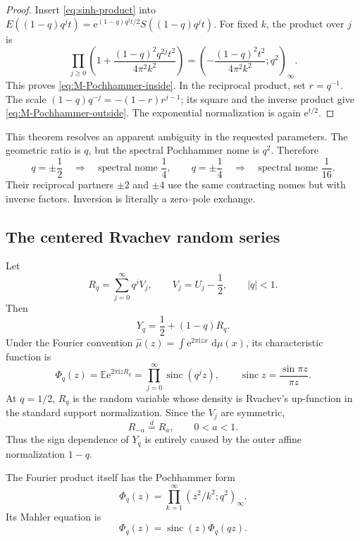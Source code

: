 \documentclass[11pt,oneside]{article}
\numberwithin{equation}{section}
\theoremstyle{definition}
\theoremstyle{remark}
\newcommand{\sinc}{\operatorname{sinc}}
\newcommand{\E}{\mathbb E}
\newcommand{\dd}{\,\mathrm d}
\newcommand{\e}{\mathrm e}
\newcommand{\ii}{\mathrm i}
\newcommand{\qpoch}[3]{\left(#1;#2\right)_{#3}}
\begin{document}
\begin{proof}
Insert \eqref{eq:sinh-product} into
$E((1-q)q^jt)=\e^{(1-q)q^jt/2}S((1-q)q^jt)$.  For fixed $k$, the product over
$j$ is
\[
 \prod_{j\ge0}\left(1+
 \frac{(1-q)^2q^{2j}t^2}{4\pi^2k^2}\right)
 =\qpoch{-\dfrac{(1-q)^2t^2}{4\pi^2k^2}}{q^2}{\infty}.
\]
This proves \eqref{eq:M-Pochhammer-inside}.  In the reciprocal product, set
$r=q^{-1}$.  The scale $(1-q)q^{-j}=-(1-r)r^{j-1}$; its square and the inverse
product give \eqref{eq:M-Pochhammer-outside}.  The exponential normalization
is again $\e^{t/2}$.
\end{proof}

This theorem resolves an apparent ambiguity in the requested parameters.  The
geometric ratio is $q$, but the spectral Pochhammer nome is $q^2$.  Therefore
\[
 q=\pm\frac12 \quad\Longrightarrow\quad \text{spectral nome }\frac14,
 \qquad
 q=\pm\frac14 \quad\Longrightarrow\quad \text{spectral nome }\frac1{16}.
\]
Their reciprocal partners $\pm2$ and $\pm4$ use the same contracting nomes but
with inverse factors.  Inversion is literally a zero--pole exchange.

\subsection{The centered Rvachev random series}

Let
\begin{equation}
 R_q=\sum_{j=0}^{\infty}q^jV_j,
 \qquad V_j=U_j-\frac12,
 \qquad |q|<1.
 \label{eq:Rq}
\end{equation}
Then
\begin{equation}
 Y_q=\frac12+(1-q)R_q.
 \label{eq:Y-R}
\end{equation}
Under the Fourier convention
$\widehat\mu(z)=\int\e^{2\pi\ii zx}\,\dd\mu(x)$, its characteristic function is
\begin{equation}
 \Phi_q(z)=\E\e^{2\pi\ii zR_q}
 =\prod_{j=0}^{\infty}\sinc(q^jz),
 \qquad
 \sinc z=\frac{\sin\pi z}{\pi z}.
 \label{eq:Phi-q}
\end{equation}
At $q=1/2$, $R_q$ is the random variable whose density is Rvachev's
up-function in the standard support normalization.  Since the $V_j$ are
symmetric,
\begin{equation}
 R_{-a}\stackrel d=R_a,
 \qquad 0<a<1.
 \label{eq:R-sign}
\end{equation}
Thus the sign dependence of $Y_q$ is entirely caused by the outer affine
normalization $1-q$.

The Fourier product itself has the Pochhammer form
\begin{equation}
 \boxed{
 \Phi_q(z)=\prod_{k=1}^{\infty}
 \qpoch{z^2/k^2}{q^2}{\infty}.}
 \label{eq:Phi-Pochhammer}
\end{equation}
Its Mahler equation is
\begin{equation}
 \Phi_q(z)=\sinc(z)\Phi_q(qz).
 \label{eq:Phi-Mahler}
\end{equation}
\end{document}
